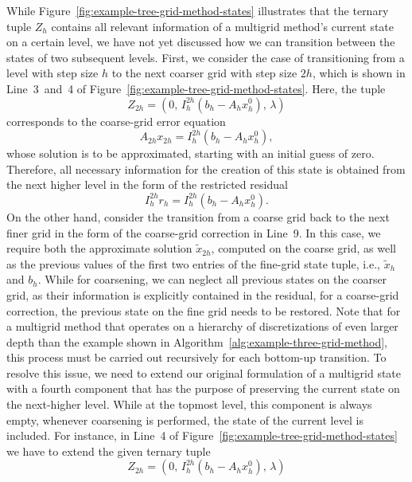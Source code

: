 While Figure~\ref{fig:example-tree-grid-method-states} illustrates that the ternary tuple $Z_h$ contains all relevant information of a multigrid method's current state on a certain level, we have not yet discussed how we can transition between the states of two subsequent levels.
First, we consider the case of transitioning from a level with step size $h$ to the next coarser grid with step size $2h$, which is shown in Line~3~and~4 of Figure~\ref{fig:example-tree-grid-method-states}.
Here, the tuple
\begin{equation*}
	Z_{2h} = (0, \, I_{h}^{2h}(b_{h} - A_h x_{h}^0), \, \lambda)
\end{equation*} 
corresponds to the coarse-grid error equation 
\begin{equation*}
	A_{2h} x_{2h} = I_{h}^{2h}(b_{h} - A_h x_{h}^0),
\end{equation*}
whose solution is to be approximated, starting with an initial guess of zero.
Therefore, all necessary information for the creation of this state is obtained from the next higher level in the form of the restricted residual 
\begin{equation*}
    I_h^{2h} r_h = I_h^{2h} (b_{h} - A_h x_{h}^0).
\end{equation*}
On the other hand, consider the transition from a coarse grid back to the next finer grid in the form of the coarse-grid correction in Line~9.
In this case, we require both the approximate solution $\tilde{x}_{2h}$, computed on the coarse grid, as well as the previous values of the first two entries of the fine-grid state tuple, i.e., $\tilde{x}_h$ and $b_h$.
While for coarsening, we can neglect all previous states on the coarser grid, as their information is explicitly contained in the residual, for a coarse-grid correction, the previous state on the fine grid needs to be restored.
Note that for a multigrid method that operates on a hierarchy of discretizations of even larger depth than the example shown in Algorithm~\ref{alg:example-three-grid-method}, this process must be carried out recursively for each bottom-up transition.
To resolve this issue, we need to extend our original formulation of a multigrid state with a fourth component that has the purpose of preserving the current state on the next-higher level.
While at the topmost level, this component is always empty, whenever coarsening is performed, the state of the current level is included.
For instance, in Line~4 of Figure~\ref{fig:example-tree-grid-method-states} we have to extend the given ternary tuple 
\begin{equation*}
Z_{2h} = (0, \, I_{h}^{2h}(b_{h} - A_h x_{h}^0), \, \lambda)
\end{equation*}
